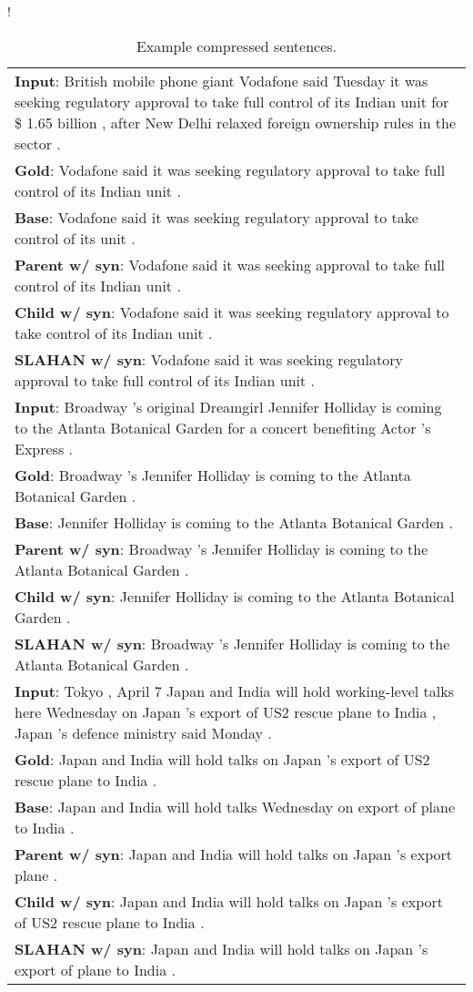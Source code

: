 \documentclass[letterpaper]{article} \usepackage{aaai20}  \usepackage{times}  \usepackage{helvet} \usepackage{courier}  \usepackage[hyphens]{url}  \usepackage{graphicx} \urlstyle{rm} \def\UrlFont{\rm}  \usepackage{graphicx}  \frenchspacing  \setlength{\pdfpagewidth}{8.5in}  \setlength{\pdfpageheight}{11in}  \usepackage{tabu}
\begin{document}
\begin{table}[t]
    \small
    \centering
    \resizebox {0.9\columnwidth} {!} {
    \begin{tabular}{p{}}
        \toprule
         {\bf Input}: British mobile phone giant Vodafone said Tuesday it was seeking regulatory approval to take full control of its Indian unit for \$ 1.65 billion , after New Delhi relaxed foreign ownership rules in the sector .\\
         {\bf Gold}: Vodafone said it was seeking regulatory approval to take full control of its Indian unit .\\
         {\bf Base}: Vodafone said it was seeking regulatory approval to take control of its unit .\\
         {\bf Parent w/ syn}: Vodafone said it was seeking approval to take full control of its Indian unit .\\
         {\bf Child w/ syn}: Vodafone said it was seeking regulatory approval to take control of its Indian unit . \\
         {\bf SLAHAN w/ syn}: Vodafone said it was seeking regulatory approval to take full control of its Indian unit .\\
        \midrule
         {\bf Input}: Broadway 's original Dreamgirl Jennifer Holliday is coming to the Atlanta Botanical Garden for a concert benefiting Actor 's Express .\\
         {\bf Gold}: Broadway 's Jennifer Holliday is coming to the Atlanta Botanical Garden .\\
         {\bf Base}: Jennifer Holliday is coming to the Atlanta Botanical Garden .\\
         {\bf Parent w/ syn}: Broadway 's Jennifer Holliday is coming to the Atlanta Botanical Garden .\\
         {\bf Child w/ syn}: Jennifer Holliday is coming to the Atlanta Botanical Garden .\\
         {\bf SLAHAN w/ syn}: Broadway 's Jennifer Holliday is coming to the Atlanta Botanical Garden . \\
        \midrule
         {\bf Input}: Tokyo , April 7 Japan and India will hold working-level talks here Wednesday on Japan 's export of US2 rescue plane to India , Japan 's defence ministry said Monday .\\
         {\bf Gold}: Japan and India will hold talks on Japan 's export of US2 rescue plane to India .\\
         {\bf Base}: Japan and India will hold talks Wednesday on export of plane to India .\\
         {\bf Parent w/ syn}: Japan and India will hold talks on Japan 's export plane . \\
         {\bf Child w/ syn}: Japan and India will hold talks on Japan 's export of US2 rescue plane to India . \\
         {\bf SLAHAN w/ syn}: Japan and India will hold talks on Japan 's export of plane to India .\\
        \bottomrule
    \end{tabular}
    }
    \caption{Example compressed sentences.}
    \label{tb:analysis}
\end{table}
\end{document}
